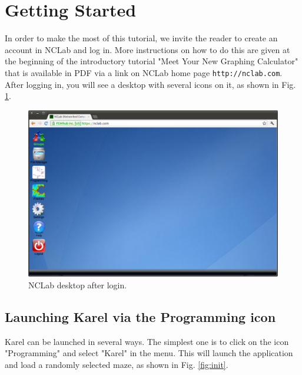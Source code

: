 \documentclass[article,A4,12pt]{llncs}
\begin{document}
\section{Getting Started}

In order to make the most of this tutorial, we invite the 
reader to create an account in NCLab and log in. More instructions 
on how to do this are given at the beginning of the introductory 
tutorial "Meet Your New Graphing Calculator" that is available in 
PDF via a link on NCLab home page {\tt http://nclab.com}.\\

\noindent
After logging in, you will see a desktop with several icons on it,
as shown in Fig. \ref{fig:desktop}. 

\begin{figure}[!ht]
\begin{center}
\includegraphics[width=\textwidth]{img/desktop.png}
\end{center}
\caption{NCLab desktop after login.}
\label{fig:desktop}
\end{figure}

\subsection{Launching Karel via the Programming icon}

Karel can be launched in several ways. The simplest one is to click on the icon 
"Programming" and select "Karel" in the menu. This will launch the application 
and load a randomly selected maze, as shown in Fig. \ref{fig:init}.
\end{document}

